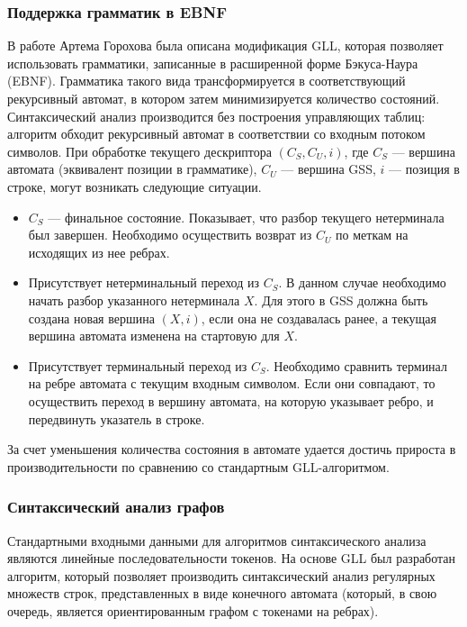 \subsubsection{Поддержка грамматик в EBNF}

В работе Артема Горохова \cite{Gorokhov2017ebnf} была описана модификация GLL, которая позволяет использовать грамматики, записанные в расширенной форме Бэкуса-Наура (EBNF). Грамматика такого вида трансформируется в соответствующий рекурсивный автомат, в котором затем минимизируется количество состояний. Синтаксический анализ производится без построения управляющих таблиц: алгоритм обходит рекурсивный автомат в соответствии со входным потоком символов. При обработке текущего дескриптора $(C_S, C_U, i)$, где $C_S$ --- вершина автомата (эквивалент позиции в грамматике), $C_U$ --- вершина GSS, $i$ --- позиция в строке, могут возникать следующие ситуации.

\begin{itemize}
	\item $C_S$ --- финальное состояние. Показывает, что разбор текущего нетерминала был завершен. Необходимо осуществить возврат из $C_U$ по меткам на исходящих из нее ребрах.
	\item Присутствует нетерминальный переход из $C_S$. В данном случае необходимо начать разбор указанного нетерминала $X$. Для этого в GSS должна быть создана новая вершина $(X, i)$, если она не создавалась ранее, а текущая вершина автомата изменена на стартовую для $X$.
	\item Присутствует терминальный переход из $C_S$. Необходимо сравнить терминал на ребре автомата с текущим входным символом. Если они совпадают, то осуществить переход в вершину автомата, на которую указывает ребро, и передвинуть указатель в строке.
\end{itemize}

За счет уменьшения количества состояния в автомате удается достичь прироста в производительности по сравнению со стандартным GLL-алгоритмом. 

\subsubsection{Синтаксический анализ графов}

Стандартными входными данными для алгоритмов синтаксического анализа являются линейные последовательности токенов. На основе GLL был разработан алгоритм, который позволяет производить синтаксический анализ регулярных множеств строк, представленных в виде конечного автомата (который, в свою очередь, является ориентированным графом с токенами на ребрах).

